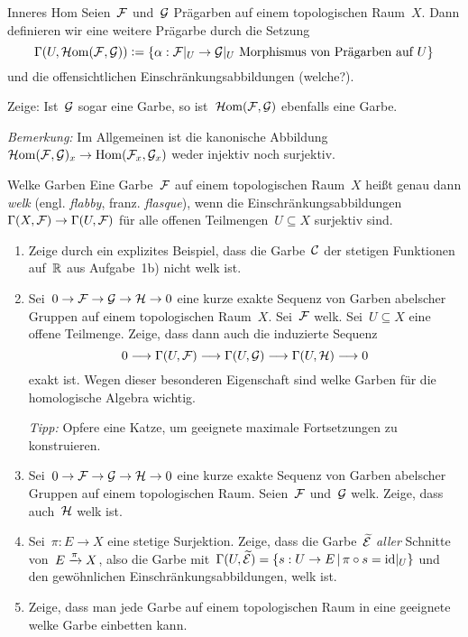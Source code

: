 \documentclass{uebblatt}
\begin{document}
\begin{aufgabe}{Inneres Hom}
Seien~$\mathcal{F}$ und~$\mathcal{G}$ Prägarben auf einem topologischen Raum~$X$. Dann
definieren wir eine weitere Prägarbe durch die Setzung
\[ \Gamma(U, \mathcal{H}\mathrm{om}(\mathcal{F},\mathcal{G})) \vcentcolon= \{ \alpha : \mathcal{F}|_U \to \mathcal{G}|_U \text{ Morphismus von Prägarben auf~$U$} \} \]
und die offensichtlichen Einschränkungsabbildungen (welche?).

Zeige: Ist~$\mathcal{G}$ sogar eine Garbe, so ist~$\mathcal{H}\mathrm{om}(\mathcal{F},\mathcal{G})$ ebenfalls eine Garbe.

{\tiny
\emph{Bemerkung:} Im Allgemeinen ist die kanonische
Abbildung~$\mathcal{H}\mathrm{om}(\mathcal{F},\mathcal{G})_x \to \mathrm{Hom}(\mathcal{F}_x,\mathcal{G}_x)$ weder injektiv noch surjektiv.\par}
\end{aufgabe}

\newpage

\begin{aufgabe}{Welke Garben}
Eine Garbe~$\mathcal{F}$ auf einem topologischen Raum~$X$ heißt genau dann \emph{welk}
(engl. \emph{flabby}, franz. \emph{flasque}),
wenn die Einschränkungsabbildungen~$\Gamma(X,\mathcal{F}) \to \Gamma(U,\mathcal{F})$ für alle
offenen Teilmengen~$U \subseteq X$ surjektiv sind.

\begin{enumerate}
\item Zeige durch ein explizites Beispiel, dass die Garbe~$\mathcal{C}$ der stetigen
Funktionen auf~$\mathbb{R}$ aus Aufgabe~1b) nicht welk ist.
\item Sei~$0 \to \mathcal{F} \to \mathcal{G} \to \mathcal{H} \to 0$ eine kurze exakte Sequenz von Garben
abelscher Gruppen auf einem topologischen Raum~$X$. Sei~$\mathcal{F}$ welk. Sei~$U
\subseteq X$ eine offene Teilmenge. Zeige, dass
dann auch die induzierte Sequenz
\[ 0 \longrightarrow \Gamma(U,\mathcal{F}) \longrightarrow \Gamma(U,\mathcal{G}) \longrightarrow \Gamma(U,\mathcal{H}) \longrightarrow 0 \]
exakt ist. Wegen dieser besonderen Eigenschaft sind welke Garben für die
homologische Algebra wichtig.

{\tiny
\emph{Tipp:} Opfere eine Katze, um geeignete maximale Fortsetzungen
zu konstruieren.\par}
\item Sei~$0 \to \mathcal{F} \to \mathcal{G} \to \mathcal{H} \to 0$ eine kurze exakte Sequenz von Garben
abelscher Gruppen auf einem topologischen Raum. Seien~$\mathcal{F}$ und~$\mathcal{G}$ welk.
Zeige, dass auch~$\mathcal{H}$ welk ist.
\item Sei~$\pi : E \to X$ eine stetige Surjektion. Zeige, dass die
Garbe~$\widetilde{\mathcal{E}}$ \emph{aller} Schnitte von~$E \xrightarrow{\pi} X$, also die Garbe
mit~$\Gamma(U,\widetilde{\mathcal{E}}) = \{ s : U \to E \,|\, \pi
\circ s = \mathrm{id}|_U \}$ und den gewöhnlichen Einschränkungsabbildungen, welk ist.
\item Zeige, dass man jede Garbe auf einem topologischen Raum in eine geeignete
welke Garbe einbetten kann.
\end{enumerate}
\end{aufgabe}
\end{document}
